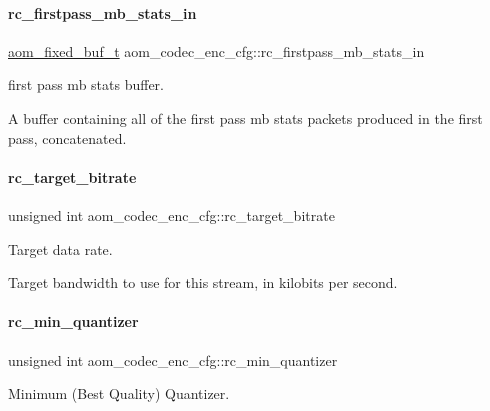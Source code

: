 \paragraph{\texorpdfstring{rc\+\_\+firstpass\+\_\+mb\+\_\+stats\+\_\+in}{rc\_firstpass\_mb\_stats\_in}}
{\footnotesize\ttfamily \hyperlink{group__encoder_ga85cca9fad6bc25c667f013a39c607174}{aom\+\_\+fixed\+\_\+buf\+\_\+t} aom\+\_\+codec\+\_\+enc\+\_\+cfg\+::rc\+\_\+firstpass\+\_\+mb\+\_\+stats\+\_\+in}



first pass mb stats buffer. 

A buffer containing all of the first pass mb stats packets produced in the first pass, concatenated. \mbox{\label{structaom__codec__enc__cfg_ab21539da477dba7506d90353c27d218b}} 
\paragraph{\texorpdfstring{rc\+\_\+target\+\_\+bitrate}{rc\_target\_bitrate}}
{\footnotesize\ttfamily unsigned int aom\+\_\+codec\+\_\+enc\+\_\+cfg\+::rc\+\_\+target\+\_\+bitrate}



Target data rate. 

Target bandwidth to use for this stream, in kilobits per second. \mbox{\label{structaom__codec__enc__cfg_aa5c6cede8c820ef29fc3c106aa1227eb}} 
\paragraph{\texorpdfstring{rc\+\_\+min\+\_\+quantizer}{rc\_min\_quantizer}}
{\footnotesize\ttfamily unsigned int aom\+\_\+codec\+\_\+enc\+\_\+cfg\+::rc\+\_\+min\+\_\+quantizer}



Minimum (Best Quality) Quantizer. 

